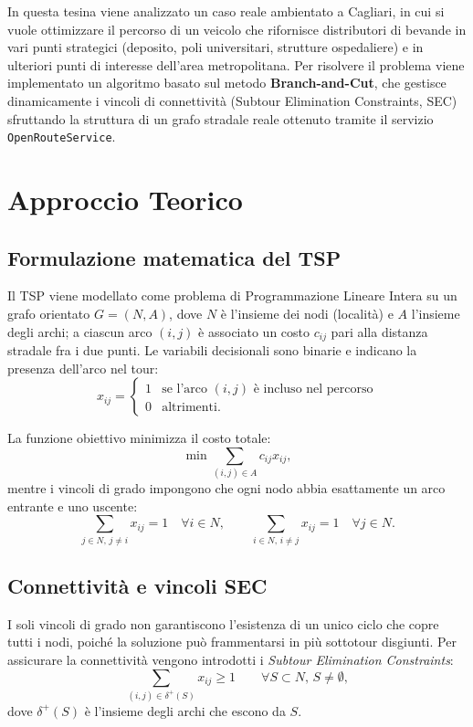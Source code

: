 \documentclass[a4paper,12pt]{article}
\begin{document}
In questa tesina viene analizzato un caso reale ambientato a Cagliari, in cui si vuole ottimizzare il percorso di un veicolo che rifornisce distributori di bevande in vari punti strategici (deposito, poli universitari, strutture ospedaliere) e in ulteriori punti di interesse dell’area metropolitana.
Per risolvere il problema viene implementato un algoritmo basato sul metodo \textbf{Branch-and-Cut}, che gestisce dinamicamente i vincoli di connettività (Subtour Elimination Constraints, SEC) sfruttando la struttura di un grafo stradale reale ottenuto tramite il servizio \texttt{OpenRouteService}.

\section{Approccio Teorico}

\subsection{Formulazione matematica del TSP}

Il TSP viene modellato come problema di Programmazione Lineare Intera su un grafo orientato \(G=(N,A)\), dove \(N\) è l’insieme dei nodi (località) e \(A\) l’insieme degli archi; a ciascun arco \((i,j)\) è associato un costo \(c_{ij}\) pari alla distanza stradale fra i due punti.  
Le variabili decisionali sono binarie e indicano la presenza dell’arco nel tour:
\[
x_{ij} =
\begin{cases}
1 & \text{se l'arco } (i,j) \text{ è incluso nel percorso}\\
0 & \text{altrimenti.}
\end{cases}
\]

La funzione obiettivo minimizza il costo totale:
\[
\min \sum_{(i,j)\in A} c_{ij} x_{ij},
\]
mentre i vincoli di grado impongono che ogni nodo abbia esattamente un arco entrante e uno uscente:
\[
\sum_{j\in N,\,j\neq i} x_{ij}=1 \quad \forall i\in N,
\qquad
\sum_{i\in N,\,i\neq j} x_{ij}=1 \quad \forall j\in N.
\]

\subsection{Connettività e vincoli SEC}

I soli vincoli di grado non garantiscono l’esistenza di un unico ciclo che copre tutti i nodi, poiché la soluzione può frammentarsi in più sottotour disgiunti.  
Per assicurare la connettività vengono introdotti i \textit{Subtour Elimination Constraints}:
\[
\sum_{(i,j)\in\delta^{+}(S)} x_{ij} \ge 1 \qquad \forall S\subset N,\,S\neq\emptyset,
\]
dove \(\delta^{+}(S)\) è l’insieme degli archi che escono da \(S\). 
\end{document}
